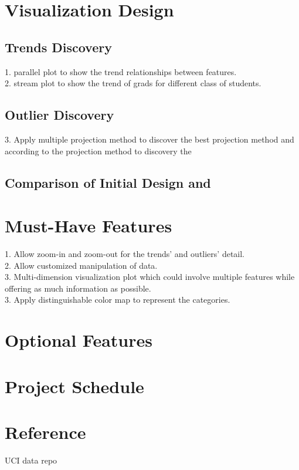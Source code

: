 \documentclass{article}
\begin{document}
\section{Visualization Design}
\subsection{Trends Discovery}
1. parallel plot to show the trend relationships between features. \\
2. stream plot to show the trend of grads for different class of students.
\subsection{Outlier Discovery}
3. Apply multiple projection method to discover the best projection method and according to the projection method to discovery the 
\subsection{Comparison of Initial Design and}
\section{Must-Have Features}
1. Allow zoom-in and zoom-out for the trends' and outliers' detail. \\
2. Allow customized manipulation of data. \\ 
3. Multi-dimension visualization plot which could involve multiple features while offering as much information as possible. \\
3. Apply distinguishable color map to represent the categories. \\
\section{Optional Features}
\section{Project Schedule}
\section{Reference}
UCI data repo
\end{document}

